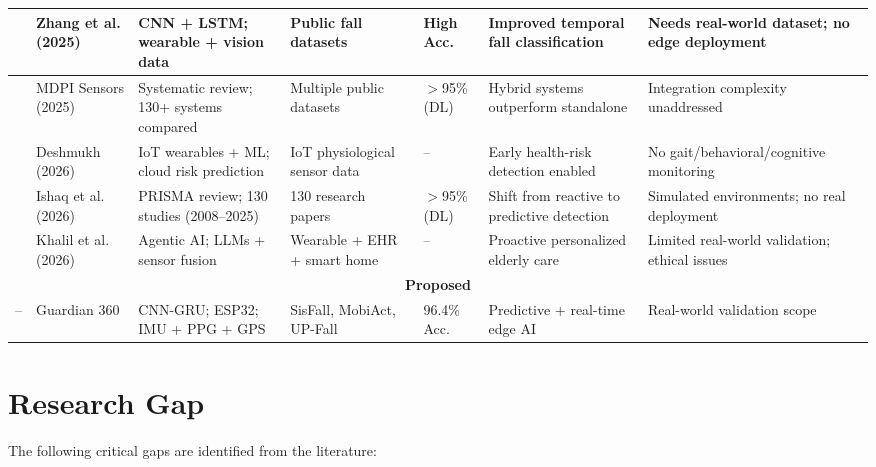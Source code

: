 \documentclass[conference]{IEEEtran}
\begin{document}
\begin{table}[!t]
\begin{tabular}{|p{0.6cm}|p{1.8cm}|p{2.2cm}|p{1.8cm}|p{1.0cm}|p{2.5cm}|p{2.8cm}|}
\hline
\cite{b5} & Zhang et al. (2025) & CNN + LSTM; wearable + vision data & Public fall datasets & High Acc. & Improved temporal fall classification & Needs real-world dataset; no edge deployment \\
\hline
\cite{b15} & MDPI Sensors (2025) & Systematic review; 130+ systems compared & Multiple public datasets & $>$95\% (DL) & Hybrid systems outperform standalone & Integration complexity unaddressed \\
\hline
\cite{b21} & Deshmukh (2026) & IoT wearables + ML; cloud risk prediction & IoT physiological sensor data & -- & Early health-risk detection enabled & No gait/behavioral/cognitive monitoring \\
\hline
\cite{b2} & Ishaq et al. (2026) & PRISMA review; 130 studies (2008--2025) & 130 research papers & $>$95\% (DL) & Shift from reactive to predictive detection & Simulated environments; no real deployment \\
\hline
\cite{b22} & Khalil et al. (2026) & Agentic AI; LLMs + sensor fusion & Wearable + EHR + smart home & -- & Proactive personalized elderly care & Limited real-world validation; ethical issues \\
\hline
\multicolumn{7}{|c|}{\textbf{Proposed}} \\
\hline
-- & Guardian 360 & CNN-GRU; ESP32; IMU + PPG + GPS & SisFall, MobiAct, UP-Fall & 96.4\% Acc. & Predictive + real-time edge AI & Real-world validation scope \\
\hline
\end{tabular}
\end{table}

\section{Research Gap}

The following critical gaps are identified from the literature:
\end{document}
